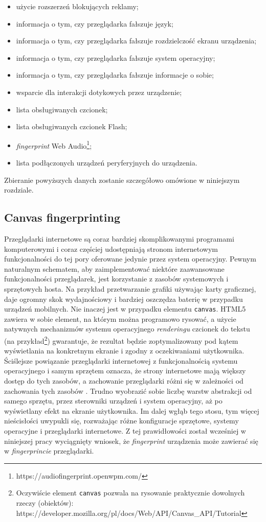 \begin{itemize}
	\item użycie rozszerzeń blokujących reklamy;
	\item informacja o tym, czy przeglądarka fałszuje język;
	\item informacja o tym, czy przeglądarka fałszuje rozdzielczość ekranu
	      urządzenia;
	\item informacja o tym, czy przeglądarka fałszuje system operacyjny;
	\item informacja o tym, czy przeglądarka fałszuje informacje o sobie;
	\item wsparcie dla interakcji dotykowych przez urządzenie;
	\item lista obsługiwanych czcionek;
	\item lista obsługiwanych czcionek Flash;
	\item \emph{fingerprint} Web
	      Audio\footnote{https://audiofingerprint.openwpm.com/};
	\item lista podłączonych urządzeń peryferyjnych do urządzenia.
\end{itemize}

Zbieranie powyższych danych zostanie szczegółowo omówione w niniejszym
rozdziale.

\subsection{Canvas fingerprinting}
Przeglądarki internetowe są coraz bardziej skomplikowanymi programami
komputerowymi i coraz częściej udostępniają stronom internetowym funkcjonalności
do tej pory oferowane jedynie przez system operacyjny. Pewnym naturalnym
schematem, aby zaimplementować niektóre zaawansowane funkcjonalności
przeglądarek, jest korzystanie z zasobów systemowych i sprzętowych hosta. Na
przykład przetwarzanie grafiki używając karty graficznej, daje ogromny skok
wydajnościowy i bardziej oszczędza baterię w przypadku urządzeń mobilnych. Nie
inaczej jest w przypadku elementu \texttt{canvas}. HTML5 zawiera w sobie
element, na którym można programowo rysować, a użycie natywnych mechanizmów
systemu operacyjnego \emph{renderingu} czcionek do tekstu (na
przykład\footnote{Oczywiście element \texttt{canvas} pozwala na rysowanie
	praktycznie dowolnych rzeczy (obiektów):
	https://developer.mozilla.org/pl/docs/Web/API/Canvas\_API/Tutorial})
gwarantuje, że rezultat będzie zoptymalizowany pod kątem wyświetlania na
konkretnym ekranie i zgodny z oczekiwaniami użytkownika. Ściślejsze powiązanie
przeglądarki internetowej z funkcjonalnością systemu operacyjnego i samym
sprzętem oznacza, że strony internetowe mają większy dostęp do tych zasobów, a
zachowanie przeglądarki różni się w zależności od zachowania tych zasobów
\cite[s. 1]{mowery2012pixel}. Trudno wyobrazić sobie liczbę warstw abstrakcji od
samego sprzętu, przez sterowniki urządzeń i system operacyjny, aż po wyświetlany
efekt na ekranie użytkownika. Im dalej wgłąb tego stosu, tym więcej nieścisłości
uwypukli się, rozważając różne konfiguracje sprzętowe, systemy operacyjne i
przeglądarki internetowe. Z tej prawidłowości został wcześniej w niniejszej
pracy wyciągnięty wniosek, że \emph{fingerprint} urządzenia może zawierać się w
\emph{fingerprincie} przeglądarki.

